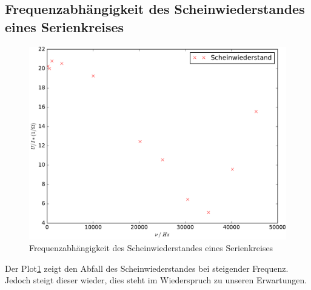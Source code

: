     \subsection{Frequenzabhängigkeit des Scheinwiederstandes eines Serienkreises}
    \begin{figure}
      \centering
      \includegraphics[width=\textwidth]{./logos/5eplot.pdf}
        \caption{Frequenzabhängigkeit des Scheinwiederstandes eines Serienkreises}
        \label{fig:5eplot}
      \end{figure}
      Der Plot\ref{fig:5eplot} zeigt den Abfall des Scheinwiederstandes bei
      steigender Frequenz. Jedoch steigt dieser
      wieder, dies steht im Wiederspruch zu unseren Erwartungen.
